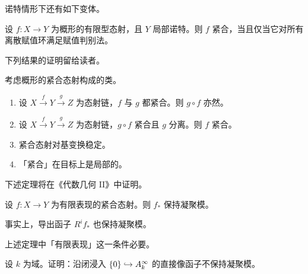 诺特情形下还有如下变体。

\begin{corollary}\label{cor:24.4.6}
设 $f\colon X \to Y$ 为概形的有限型态射，且 $Y$ 局部诺特。则 $f$ 紧合，当且仅当它对所有离散赋值环满足赋值判别法。
\end{corollary}

下列结果的证明留给读者。

\begin{lemma}\label{lem:24.4.7}
考虑概形的紧合态射构成的类。
\begin{enumerate}[label=(\roman*),leftmargin=2em,itemsep=0.25ex]
  \item 设 $X \xrightarrow{f} Y \xrightarrow{g} Z$ 为态射链，$f$ 与 $g$ 都紧合。则 $g \circ f$ 亦然。
  \item 设 $X \xrightarrow{f} Y \xrightarrow{g} Z$ 为态射链，$g \circ f$ 紧合且 $g$ 分离。则 $f$ 紧合。
  \item 紧合态射对基变换稳定。
  \item 「紧合」在目标上是局部的。
\end{enumerate}
\end{lemma}

下述定理将在《代数几何 II》中证明。

\begin{theorem}\label{thm:24.4.8}
设 $f\colon X \to Y$ 为有限表现的紧合态射。则 $f_*$ 保持凝聚模。
\end{theorem}

\begin{remark}\label{rem:24.4.9}
事实上，导出函子 $R^i f_*$ 也保持凝聚模。
\end{remark}

\begin{warning}\label{warn:24.4.10}
上述定理中「有限表现」这一条件必要。
\end{warning}

\begin{exercise}\label{exc:24.4.11}
设 $k$ 为域。证明：沿闭浸入 $\{0\} \hookrightarrow A^{\infty}_k$ 的直接像函子不保持凝聚模。
\end{exercise}

